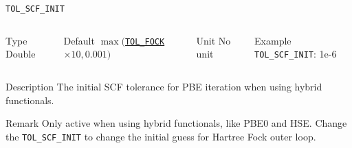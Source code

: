 \documentclass[xcolor=dvipsnames,t]{beamer}
\begin{document}
\begin{frame}[allowframebreaks]{\texttt{TOL\_SCF\_INIT}} \label{TOL_SCF_INIT}
\vspace*{-12pt}
\begin{columns}
\begin{block}{Type}
Double
\end{block}

\begin{block}{Default}
$\max($\hyperlink{TOL_FOCK}{\texttt{TOL\_FOCK}}$\times 10,0.001)$
\end{block}

\begin{block}{Unit}
No unit
\end{block}

\begin{block}{Example}
\texttt{TOL\_SCF\_INIT}: 1e-6
\end{block}
\end{columns}

\begin{block}{Description}
The initial SCF tolerance for PBE iteration when using hybrid functionals. 
\end{block}

\begin{block}{Remark}
Only active when using hybrid functionals, like PBE0 and HSE. Change the \texttt{TOL\_SCF\_INIT} to change the initial guess for Hartree Fock outer loop.
\end{block}

\end{frame}
\end{document}

